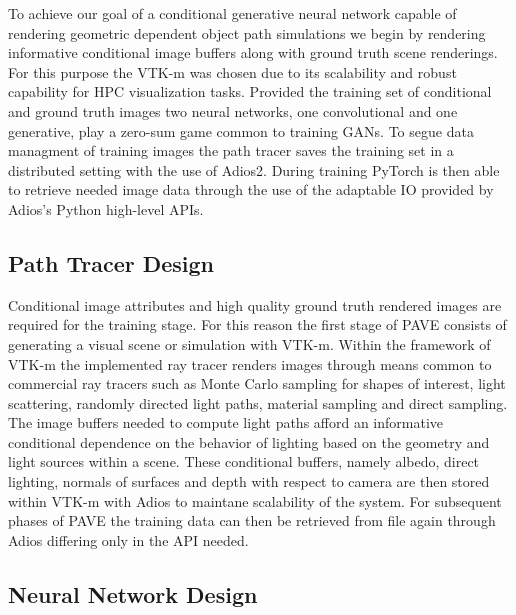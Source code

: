 \documentclass[sigconf,authordraft]{acmart}
\begin{document}
To achieve our goal of a conditional generative neural network capable of rendering geometric dependent object path simulations we begin by rendering informative conditional image buffers along with ground truth scene renderings. For this purpose the VTK-m was chosen due to its scalability and robust capability for HPC visualization tasks. Provided the training set of conditional and ground truth images two neural networks, one convolutional and one generative, play a zero-sum game common to training GANs. To segue data managment of training images the path tracer saves the training set in a distributed setting with the use of Adios2. During training PyTorch is then able to retrieve needed image data through the use of the adaptable IO provided by Adios's Python high-level APIs.

\subsection{Path Tracer Design}

Conditional image attributes and high quality ground truth rendered images are required for the training stage. For this reason the first stage of PAVE consists of generating a visual scene or simulation with VTK-m. Within the framework of VTK-m the implemented ray tracer renders images through means common to commercial ray tracers such as Monte Carlo sampling for shapes of interest, light scattering, randomly directed light paths, material sampling and direct sampling. The image buffers needed to compute light paths afford an informative conditional dependence on the behavior of lighting based on the geometry and light sources within a scene. These conditional buffers, namely albedo, direct lighting, normals of surfaces and depth with respect to camera are then stored within VTK-m with Adios to maintane scalability of the system. For subsequent phases of PAVE the training data can then be retrieved from file again through Adios differing only in the API needed. 

\subsection{Neural Network Design}
\end{document}
